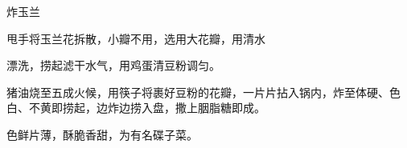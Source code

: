 \begin{recipe}{炸玉兰}

\ingredients


\cooking

\step 甩手将玉兰花拆散，小瓣不用，选用大花瓣，用清水

漂洗，捞起滤干水气，用鸡蛋清豆粉调匀。

\step 猪油烧至五成火候，用筷子将裹好豆粉的花瓣，一片片拈入锅内，炸至体硬、色白、不黄即捞起，边炸边捞入盘，撒上胭脂糖即成。

\notes

色鲜片薄，酥脆香甜，为有名碟子菜。

\end{recipe}

